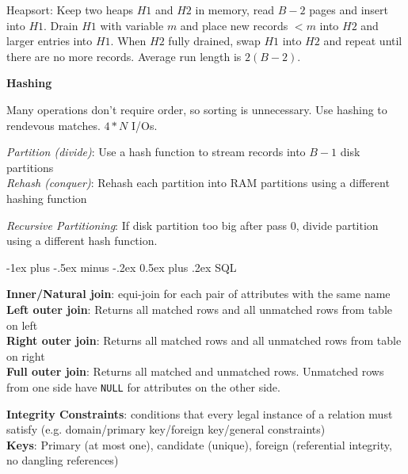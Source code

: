 \documentclass[10pt,landscape]{article}
\makeatletter
\renewcommand{\section}{\@startsection{section}{1}{0mm}%
                                {-1ex plus -.5ex minus -.2ex}%
                                {0.5ex plus .2ex}%
                                {\normalfont\large\bfseries}}
\makeatother
\begin{document}
\begin{multicols}{3}
Heapsort: Keep two heaps $H1$ and $H2$ in memory, read $B-2$ pages and insert into $H1$. Drain $H1$ with variable $m$ and place new records $<m$ into $H2$ and larger entries into $H1$. When $H2$ fully drained, swap $H1$ into $H2$ and repeat until there are no more records. Average run length is $2(B-2)$.

\textbf{Hashing}

Many operations don't require order, so sorting is unnecessary. Use hashing to rendevous matches. $4*N$ I/Os.

\textit{Partition (divide)}: Use a hash function to stream records into $B-1$ disk partitions \\
\textit{Rehash (conquer)}: Rehash each partition into RAM partitions using a different hashing function

\textit{Recursive Partitioning}: If disk partition too big after pass 0, divide partition using a different hash function.


\section{SQL}

%
%

\textbf{Inner/Natural join}: equi-join for each pair of attributes with the same name \\
\textbf{Left outer join}: Returns all matched rows and all unmatched rows from table on left \\
\textbf{Right outer join}: Returns all matched rows and all unmatched rows from table on right \\
\textbf{Full outer join}: Returns all matched and unmatched rows. Unmatched rows from one side have \texttt{NULL} for attributes on the other side.

\textbf{Integrity Constraints}: conditions that every legal instance of a relation must satisfy (e.g. domain/primary key/foreign key/general constraints) \\
\textbf{Keys}: Primary (at most one), candidate (unique), foreign (referential integrity, no dangling references)


\end{multicols}
\end{document}
